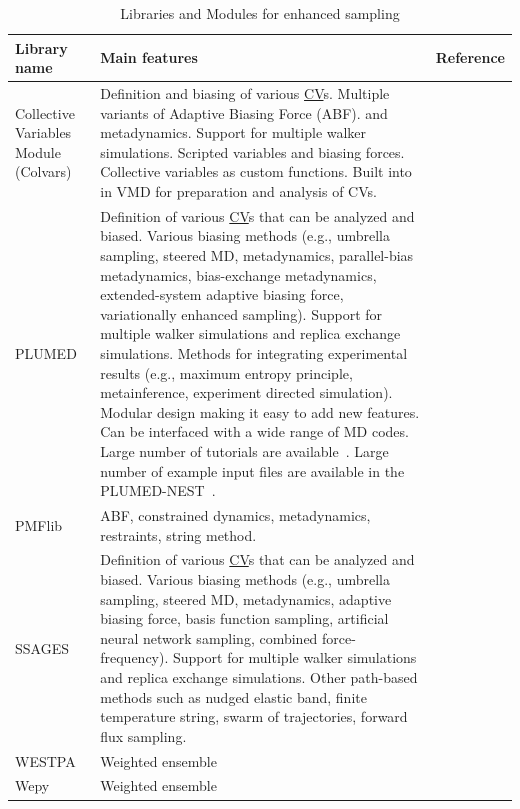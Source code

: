 \documentclass[9pt,review]{livecoms}
\begin{document}
\begin{table}[!ht]
\caption {Libraries and Modules for enhanced sampling}
\label{Table:Libraries}
\begin{tabularx}{0.95\textwidth}{
  || >{\raggedright\arraybackslash}l
  || >{\raggedright\arraybackslash}X
  | >{\raggedright\arraybackslash}l ||}
\hline
  Library name  & Main features                         & Reference \\
\hline
\hline
  Collective Variables Module (Colvars) & Definition and biasing of various \hyperlink{ref:CV} {CV}s.
  Multiple variants of Adaptive Biasing Force (ABF). and metadynamics. Support for multiple walker simulations. Scripted variables and biasing forces. Collective variables as custom functions.
  Built into in VMD for preparation and analysis of CVs. & \cite{Fiorin2013, Henin2022dashboard}\\
\hline
PLUMED        &  Definition of various \hyperlink{ref:CV} {CV}s that can be analyzed and biased. Various biasing methods (e.g., umbrella sampling, steered MD, metadynamics, parallel-bias metadynamics, bias-exchange metadynamics, extended-system adaptive biasing force, variationally enhanced sampling). Support for multiple walker simulations and replica exchange simulations. Methods for integrating experimental results (e.g., maximum entropy principle, metainference, experiment directed simulation). Modular design making it easy to add new features. Can be interfaced with a wide range of MD codes. Large number of tutorials are available~\cite{plumed_masterclass}. Large number of example input files are available in the PLUMED-NEST~\cite{plumed_nest_url}.         &  \cite{Bonomi-CPC-2009,Tribello2014,plumed-nest} \\
\hline
PMFlib        &  ABF, constrained dynamics, metadynamics, restraints, string method. &  \cite{kulhanek2011pmflib} \\
\hline
SSAGES & Definition of various \hyperlink{ref:CV} {CV}s that can be analyzed and biased. Various biasing methods (e.g., umbrella sampling, steered MD, metadynamics, adaptive biasing force, basis function sampling, artificial neural network sampling, combined force-frequency). Support for multiple walker simulations and replica exchange simulations. Other path-based methods such as nudged elastic band, finite temperature string, swarm of trajectories, forward flux sampling. & \cite{Sidky2018} \\
\hline
WESTPA        &   Weighted ensemble     & \cite{Bogetti2019Suite, Russo_2022}  \\
\hline
Wepy          &  Weighted ensemble  & \cite{samuel_d_lotz_2020_4270219} \\
\hline
\end{tabularx}
\end{table}
\end{document}
